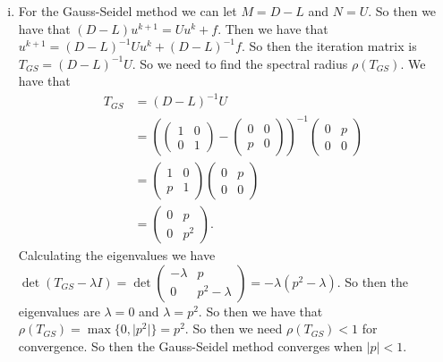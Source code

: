 \documentclass{article}
\begin{document}
\begin{enumerate}[(a)]
\begin{enumerate}[i.)]
        \newpage
        \item For the Gauss-Seidel method we can let $M = D - L$ and $N = U$. So then we have that $(D - L)u^{k+1} = Uu^k + f$. Then we have that $u^{k+1} = (D - L)^{-1}Uu^k + (D - L)^{-1}f$. So then the iteration matrix is $T_{GS} = (D - L)^{-1}U$. So we need to find the spectral radius $\rho(T_{GS})$. We have that
        \begin{align*}
            T_{GS} &= (D - L)^{-1}U \\
            &= \left( \begin{pmatrix}
                1 & 0 \\
                0 & 1
            \end{pmatrix} - \begin{pmatrix}
                0 & 0 \\
                p & 0
            \end{pmatrix} \right)^{-1} \begin{pmatrix}
                0 & p \\
                0 & 0
            \end{pmatrix} \\
            &= \begin{pmatrix}
                1 & 0 \\
                p & 1
            \end{pmatrix} \begin{pmatrix}
                0 & p \\
                0 & 0
            \end{pmatrix} \\
            &= \begin{pmatrix}
                0 & p \\
                0 & p^2
            \end{pmatrix}.
        \end{align*}
        Calculating the eigenvalues we have $\det(T_{GS} - \lambda I) = \det \begin{pmatrix}
            -\lambda & p \\
            0 & p^2 - \lambda
        \end{pmatrix} = -\lambda(p^2 - \lambda)$. So then the eigenvalues are $\lambda = 0$ and $\lambda = p^2$. So then we have that $\rho(T_{GS}) = \max\{0, \vert p^2 \vert\} = p^2$. So then we need $\rho(T_{GS}) < 1$ for convergence. So then the Gauss-Seidel method converges when $|p| < 1$.
    \end{enumerate}

\end{enumerate}
\end{document}
